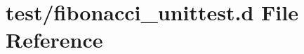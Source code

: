 \hypertarget{fibonacci__unittest_8d}{\section{test/fibonacci\-\_\-unittest.d \-File \-Reference}
\label{d7/dcc/fibonacci__unittest_8d}
}
